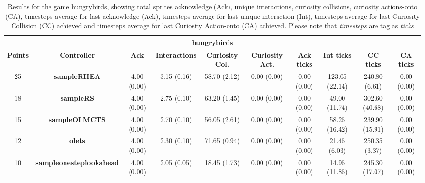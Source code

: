 \begin{table*}[!t]
\begin{center}
\begin{adjustbox}{width=1\textwidth}
\begin{tabular}{|c|c|c|c|c|c|c|c|c|c|}
\multicolumn{10}{c}{\textbf{hungrybirds}}\\
\hline
\textbf{Points} & \textbf{Controller} & \textbf{Ack} & \textbf{Interactions} & \textbf{Curiosity Col.} & \textbf{Curiosity Act.} & \textbf{Ack ticks} & \textbf{Int ticks} & \textbf{CC ticks} & \textbf{CA ticks}\\
\hline
25 & \textbf{sampleRHEA} & 4.00 (0.00) & 3.15 (0.16) & 58.70 (2.12) & 0.00 (0.00) & 0.00 (0.00) & 123.05 (22.14) & 240.80 (6.61) & 0.00 (0.00)
 \\
\hline
18 & \textbf{sampleRS} & 4.00 (0.00) & 2.75 (0.10) & 63.20 (1.45) & 0.00 (0.00) & 0.00 (0.00) & 49.00 (11.74) & 302.60 (40.68) & 0.00 (0.00)
 \\
\hline
15 & \textbf{sampleOLMCTS} & 4.00 (0.00) & 2.70 (0.10) & 56.05 (2.61) & 0.00 (0.00) & 0.00 (0.00) & 58.25 (16.42) & 239.90 (15.91) & 0.00 (0.00)
 \\
\hline
12 & \textbf{olets} & 4.00 (0.00) & 2.30 (0.10) & 71.65 (0.94) & 0.00 (0.00) & 0.00 (0.00) & 21.45 (6.03) & 250.35 (3.37) & 0.00 (0.00)
 \\
\hline
10 & \textbf{sampleonesteplookahead} & 4.00 (0.00) & 2.05 (0.05) & 18.45 (1.73) & 0.00 (0.00) & 0.00 (0.00) & 14.95 (11.85) & 245.30 (17.07) & 0.00 (0.00)
 \\
\hline
\end{tabular}
\end{adjustbox}
\caption{Results for the game hungrybirds, showing total sprites acknowledge (Ack), unique interactions, curiosity collisions, curiosity actions-onto (CA), timesteps average for last acknowledge (Ack),  timesteps average for last unique interaction (Int), timesteps average for last Curiosity Collision (CC) achieved and timesteps average for last Curiosity Action-onto (CA) achieved. Please note that \textit{timesteps} are tag as \textit{ticks}}
\label{tab:weights}
\end{center}
\end{table*}
